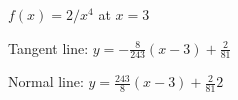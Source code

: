 {$f(x)=2/x^4$ at $x=3$
}
{Tangent line: $y = -\frac{8}{243}(x-3) + \frac{2}{81}$

Normal line: $y = \frac{243}{8}(x-3) + \frac{2}{81}2$
}
